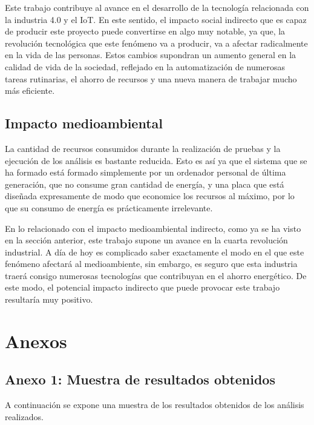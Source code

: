 \documentclass[a4paper,11pt,spanish]{sphinxmanual}
\begin{document}
\sphinxAtStartPar
Este trabajo contribuye al avance en el desarrollo de la tecnología relacionada con
la industria 4.0 y el IoT. En este sentido, el impacto social indirecto que es capaz
de producir este proyecto puede convertirse en algo muy notable, ya que, la revolución
tecnológica que este fenómeno va a producir, va a afectar radicalmente en la vida de
las personas. Estos cambios supondran un aumento general en la calidad de vida de la
sociedad, reflejado en la automatización de numerosas tareas rutinarias, el ahorro
de recursos y una nueva manera de trabajar mucho más eficiente.


\section{Impacto medioambiental}
\label{\detokenize{impacto_social_y_medioambiental:impacto-medioambiental}}
\sphinxAtStartPar
La cantidad de recursos consumidos durante la realización de pruebas y la ejecución
de los análisis es bastante reducida. Esto es así ya que el sistema que se ha formado está formado
simplemente por un ordenador personal de última generación, que no consume gran cantidad
de energía, y una placa que está diseñada expresamente de modo que economice los recursos
al máximo, por lo que su consumo de energía es prácticamente irrelevante.

\sphinxAtStartPar
En lo relacionado con el impacto medioambiental indirecto, como ya se ha visto en la
sección anterior, este trabajo supone un avance en la cuarta revolución industrial.
A día de hoy es complicado saber exactamente el modo en el que este fenómeno afectará
al medioambiente, sin embargo, es seguro que esta industria traerá consigo
numerosas tecnologías que contribuyan en el ahorro energético. De este modo, el potencial
impacto indirecto que puede provocar este trabajo resultaría muy positivo.


\chapter{Anexos}
\label{\detokenize{Anexos:anexos}}\label{\detokenize{Anexos::doc}}

\section{Anexo 1: Muestra de resultados obtenidos}
\label{\detokenize{Anexos:anexo-1-muestra-de-resultados-obtenidos}}
\sphinxAtStartPar
A continuación se expone una muestra de los resultados obtenidos
de los análisis realizados.
\end{document}
